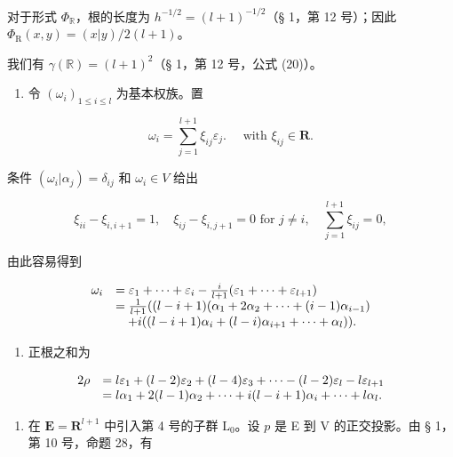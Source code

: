 对于形式 \(\Phi_{\mathbb{R}}\)，根的长度为 \(h^{-1/2} = (l + 1)^{-1/2}\)（§ 1，第 12 号）；因此 \(\Phi_{\mathrm{R}}(x,y) = (x|y)/2(l+1)\)。

我们有 \(\gamma (\mathbb{R}) = (l + 1)^2\)（§ 1，第 12 号，公式 (20)）。

\begin{enumerate}
\def\labelenumi{(\Roman{enumi})}
\setcounter{enumi}{5}
\tightlist
\item
  令 \((\omega_{i})_{1\leqslant i\leqslant l}\) 为基本权族。置
\end{enumerate}

\[
\omega_ {i} = \sum_ {j = 1} ^ {l + 1} \xi_ {i j} \varepsilon_ {j}. \quad \text { with } \xi_ {i j} \in \mathbf {R}.
\]

条件 \((\omega_{i}|\alpha_{j}) = \delta_{ij}\) 和 \(\omega_{i}\in V\) 给出

\[
\xi_ {i i} - \xi_ {i, i + 1} = 1, \quad \xi_ {i j} - \xi_ {i, j + 1} = 0 \text {   for   } j \neq i, \quad \sum_ {j = 1} ^ {l + 1} \xi_ {i j} = 0,
\]

由此容易得到

\[
\begin{array}{r l} \omega_ {i} & = \varepsilon_ {1} + \dots + \varepsilon_ {i} - \frac {i}{l + 1} (\varepsilon_ {1} + \dots + \varepsilon_ {l + 1}) \\ & = \frac {1}{l + 1} ((l - i + 1) (\alpha_ {1} + 2 \alpha_ {2} + \dots + (i - 1) \alpha_ {i - 1}) \\ & \quad + i ((l - i + 1) \alpha_ {i} + (l - i) \alpha_ {i + 1} + \dots + \alpha_ {l})). \end{array}
\]

\begin{enumerate}
\def\labelenumi{(\Roman{enumi})}
\setcounter{enumi}{6}
\tightlist
\item
  正根之和为
\end{enumerate}

\[
\begin{array}{r l} 2 \rho & = l \varepsilon_ {1} + (l - 2) \varepsilon_ {2} + (l - 4) \varepsilon_ {3} + \dots - (l - 2) \varepsilon_ {l} - l \varepsilon_ {l + 1} \\ & = l \alpha_ {1} + 2 (l - 1) \alpha_ {2} + \dots + i (l - i + 1) \alpha_ {i} + \dots + l \alpha_ {l}. \end{array}
\]

\begin{enumerate}
\def\labelenumi{(\Roman{enumi})}
\setcounter{enumi}{7}
\tightlist
\item
  在 \(\mathbf{E} = \mathbf{R}^{l + 1}\) 中引入第 4 号的子群 \(\mathrm{L}_0\)。设 \(p\) 是 E 到 V 的正交投影。由 § 1，第 10 号，命题 28，有
\end{enumerate}


